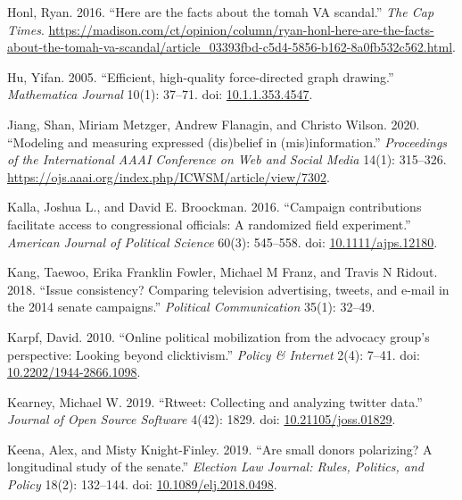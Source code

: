 \documentclass[12pt,]{article}
\newlength{\cslhangindent}
\newenvironment{CSLReferences}%
    {\setlength{\parindent}{0pt}%
    \everypar{\setlength{\hangindent}{\cslhangindent}}\ignorespaces}%
    {\par}
\begin{document}
\begin{CSLReferences}{1}{0}
\leavevmode{}%
Honl, Ryan. 2016. {``Here are the facts about the tomah VA scandal.''}
\emph{The Cap Times}.
\url{https://madison.com/ct/opinion/column/ryan-honl-here-are-the-facts-about-the-tomah-va-scandal/article_03393fbd-c5d4-5856-b162-8a0fb532c562.html}.

\leavevmode{}%
Hu, Yifan. 2005. {``Efficient, high-quality force-directed graph
drawing.''} \emph{Mathematica Journal} 10(1): 37--71. doi:
\href{https://doi.org/10.1.1.353.4547}{10.1.1.353.4547}.

\leavevmode{}%
Jiang, Shan, Miriam Metzger, Andrew Flanagin, and Christo Wilson. 2020.
{``Modeling and measuring expressed (dis)belief in (mis)information.''}
\emph{Proceedings of the International AAAI Conference on Web and Social
Media} 14(1): 315--326.
\url{https://ojs.aaai.org/index.php/ICWSM/article/view/7302}.

\leavevmode{}%
Kalla, Joshua L., and David E. Broockman. 2016. {``Campaign
contributions facilitate access to congressional officials: A randomized
field experiment.''} \emph{American Journal of Political Science} 60(3):
545--558. doi:
\href{https://doi.org/10.1111/ajps.12180}{10.1111/ajps.12180}.

\leavevmode{}%
Kang, Taewoo, Erika Franklin Fowler, Michael M Franz, and Travis N
Ridout. 2018. {``Issue consistency? Comparing television advertising,
tweets, and e-mail in the 2014 senate campaigns.''} \emph{Political
Communication} 35(1): 32--49.

\leavevmode{}%
Karpf, David. 2010. {``Online political mobilization from the advocacy
group's perspective: Looking beyond clicktivism.''} \emph{Policy \&
Internet} 2(4): 7--41. doi:
\href{https://doi.org/10.2202/1944-2866.1098}{10.2202/1944-2866.1098}.

\leavevmode{}%
Kearney, Michael W. 2019. {``Rtweet: Collecting and analyzing twitter
data.''} \emph{Journal of Open Source Software} 4(42): 1829. doi:
\href{https://doi.org/10.21105/joss.01829}{10.21105/joss.01829}.

\leavevmode{}%
Keena, Alex, and Misty Knight-Finley. 2019. {``Are small donors
polarizing? A longitudinal study of the senate.''} \emph{Election Law
Journal: Rules, Politics, and Policy} 18(2): 132--144. doi:
\href{https://doi.org/10.1089/elj.2018.0498}{10.1089/elj.2018.0498}.


\end{CSLReferences}
\end{document}
